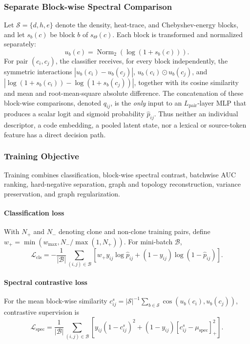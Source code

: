 \documentclass[final,5p,times,twocolumn]{elsarticle}
\newcommand{\relu}[1]{\left[#1\right]_{+}}
\theoremstyle{plain}
\begin{document}
\subsubsection{Separate Block-wise Spectral Comparison}
\label{sec:revised_head}
Let $\mathcal{S}=\{d,h,e\}$ denote the density, heat-trace, and Chebyshev-energy blocks, and let $s_b(c)$ be block $b$ of $s_{\Theta}(c)$. Each block is transformed and normalized separately:
\begin{equation}
u_b(c)=\operatorname{Norm}_2\!\left(\log(1+s_b(c))\right).
\label{eq:revised_block_normalization}
\end{equation}
For pair $(c_i,c_j)$, the classifier receives, for every block independently, the symmetric interactions $|u_b(c_i)-u_b(c_j)|$, $u_b(c_i)\odot u_b(c_j)$, and $|\log(1+s_b(c_i))-\log(1+s_b(c_j))|$, together with its cosine similarity and mean and root-mean-square absolute difference. The concatenation of these block-wise comparisons, denoted $q_{ij}$, is the \emph{only} input to an $L_{\mathrm{pair}}$-layer MLP that produces a scalar logit and sigmoid probability $\widehat{p}_{ij}$. Thus neither an individual descriptor, a code embedding, a pooled latent state, nor a lexical or source-token feature has a direct decision path.

\subsubsection{Training Objective}
\label{sec:revised_training_objective}

Training combines classification, block-wise spectral contrast, batchwise AUC ranking, hard-negative separation, graph and topology reconstruction, variance preservation, and graph regularization.

\paragraph{Classification loss}
With $N_+$ and $N_-$ denoting clone and non-clone training pairs, define $w_+=\min(w_{\max},N_-/\max(1,N_+))$. For mini-batch $\mathcal{B}$,
\begin{equation}
\mathcal{L}_{\mathrm{cls}}
=
-\frac{1}{|\mathcal{B}|}
\sum_{(i,j)\in\mathcal{B}}
\left[
w_+y_{ij}\log\widehat{p}_{ij}
+
(1-y_{ij})\log(1-\widehat{p}_{ij})
\right].
\label{eq:revised_classification_loss}
\end{equation}

\paragraph{Spectral contrastive loss}
For the mean block-wise similarity $c^s_{ij}=|\mathcal{S}|^{-1}\sum_{b\in\mathcal{S}}\cos(u_b(c_i),u_b(c_j))$, contrastive supervision \cite{hadsell2006contrastive} is
\begin{equation}
\mathcal{L}_{\mathrm{spec}}
=
\frac{1}{|\mathcal{B}|}
\sum_{(i,j)\in\mathcal{B}}
\left[
y_{ij}(1-c^s_{ij})^2
+
(1-y_{ij})
\relu{c^s_{ij}-\mu_{\mathrm{spec}}}^{2}
\right].
\label{eq:revised_spectral_contrastive}
\end{equation}
\end{document}
